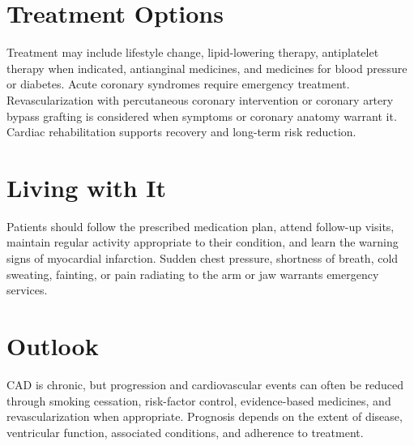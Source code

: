 \section{Treatment Options}
Treatment may include lifestyle change, lipid-lowering therapy, antiplatelet therapy when indicated, antianginal medicines, and medicines for blood pressure or diabetes. Acute coronary syndromes require emergency treatment. Revascularization with percutaneous coronary intervention or coronary artery bypass grafting is considered when symptoms or coronary anatomy warrant it. Cardiac rehabilitation supports recovery and long-term risk reduction.
\section{Living with It}
Patients should follow the prescribed medication plan, attend follow-up visits, maintain regular activity appropriate to their condition, and learn the warning signs of myocardial infarction. Sudden chest pressure, shortness of breath, cold sweating, fainting, or pain radiating to the arm or jaw warrants emergency services.
\section{Outlook}
CAD is chronic, but progression and cardiovascular events can often be reduced through smoking cessation, risk-factor control, evidence-based medicines, and revascularization when appropriate. Prognosis depends on the extent of disease, ventricular function, associated conditions, and adherence to treatment.
